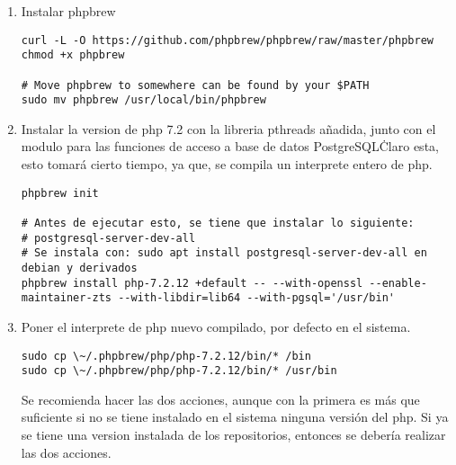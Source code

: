 \documentclass{article}
\begin{document}
\begin{enumerate}
    \item Instalar phpbrew
    \begin{lstlisting}[frame=single]
curl -L -O https://github.com/phpbrew/phpbrew/raw/master/phpbrew
chmod +x phpbrew

# Move phpbrew to somewhere can be found by your $PATH
sudo mv phpbrew /usr/local/bin/phpbrew
    \end{lstlisting}
    
    \item Instalar la version de php 7.2 con la libreria pthreads añadida,
          junto con el modulo para las funciones de acceso a base de datos
          PostgreSQL\. Claro esta, esto tomará cierto tiempo, ya que, se
          compila un interprete entero de php.
    \begin{lstlisting}[frame=single]
phpbrew init

# Antes de ejecutar esto, se tiene que instalar lo siguiente:
# postgresql-server-dev-all
# Se instala con: sudo apt install postgresql-server-dev-all en debian y derivados
phpbrew install php-7.2.12 +default -- --with-openssl --enable-maintainer-zts --with-libdir=lib64 --with-pgsql='/usr/bin'
    \end{lstlisting}
    
    \item Poner el interprete de php nuevo compilado, por defecto en el sistema.
    \begin{lstlisting}[frame=single]
sudo cp \~/.phpbrew/php/php-7.2.12/bin/* /bin
sudo cp \~/.phpbrew/php/php-7.2.12/bin/* /usr/bin
    \end{lstlisting}
    Se recomienda hacer las dos acciones, aunque con la primera es más que suficiente si no se tiene
    instalado en el sistema ninguna versión del php. Si ya se tiene una version instalada de los
    repositorios, entonces se debería realizar las dos acciones.
    

\end{enumerate}
\end{document}
